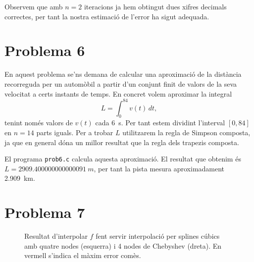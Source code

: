 \documentclass[12pt]{article}
\numberwithin{table}{section}
\numberwithin{figure}{section}
\numberwithin{equation}{section}
\begin{document}
Observem que amb $n=2$ iteracions ja hem obtingut dues xifres decimals correctes, per tant la nostra estimació de l'error ha sigut adequada.

\newpage

\section{Problema 6}
En aquest problema se'ns demana de calcular una aproximació de la distància recorreguda per un automòbil a partir d'un conjunt finit de valors de la seva velocitat a certs instants de temps. En concret volem aproximar la integral
\begin{equation*}
	L=\int_{0}^{84}v(t) \, dt,
\end{equation*}
tenint només valors de \( v(t) \) cada \SI{6}{s}. Per tant estem dividint l'interval $[0,84]$ en $n=14$ parts iguals. Per a trobar $L$ utilitzarem la regla de Simpson composta, ja que en general dóna un millor resultat que la regla dels trapezis composta. 

El programa \texttt{prob6.c} calcula aquesta aproximació. El resultat que obtenim és \( L = \SI{2909.400000000000091}{m} \), per tant la pista mesura aproximadament \SI{2.909}{km}.

\newpage
\section{Problema 7}
\begin{figure}[b]
	\centering
	\sffamily \footnotesize
	
	\caption{Resultat d'interpolar \( f \) fent servir interpolació per splines cúbics amb quatre nodes (esquerra) i 4 nodes de Chebyshev (dreta). En vermell s'indica el màxim error comès.}
	\label{fig:splines}	
\end{figure}
\end{document}
